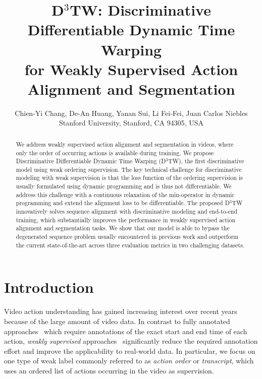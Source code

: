 \documentclass[10pt,twocolumn,letterpaper]{article}
\newcommand{\dttw}{D${}^3$TW\xspace}
\begin{document}
\title{D${}^3$TW: Discriminative Differentiable Dynamic Time Warping \\ for Weakly Supervised Action Alignment and Segmentation}
\vspace{-2mm}
\author{Chien-Yi Chang, De-An Huang, Yanan Sui, Li Fei-Fei, Juan Carlos Niebles\\
Stanford University, Stanford, CA 94305, USA\\
}

\maketitle
\thispagestyle{empty}

\begin{abstract} 
We address weakly supervised action alignment and segmentation in videos, where only the order of occurring actions is available during training.
We propose Discriminative Differentiable Dynamic Time Warping (D${}^3$TW), the first discriminative model using weak ordering supervision. The key technical challenge for discriminative modeling with weak supervision is that the loss function of the ordering supervision is usually formulated using dynamic programming and is thus not differentiable. We address this challenge with a continuous relaxation of the min-operator in dynamic programming and extend the alignment loss to be differentiable. The proposed \dttw innovatively solves sequence alignment with discriminative modeling and end-to-end training, which substantially improves the performance in weakly supervised action alignment and segmentation tasks. We show that our model is able to bypass the degenerated sequence problem usually encountered in previous work and outperform the current state-of-the-art across three evaluation metrics in two challenging datasets.
\end{abstract} \section{Introduction}
\label{sec:introduction}

Video action understanding has gained increasing interest over recent years because of the large amount of video data.
In contrast to fully annotated approaches~\cite{kuehne2014language,rohrbach2012database,yeung2015every} which require annotations of the exact start and end time of each action, \emph{weakly supervised} approaches~\cite{ding2018weakly,huang2016connectionist,richard2018neuralnetwork,bojanowski2014weakly,kuehne2017weakly} significantly reduce the required annotation effort and improve the applicability to real-world data. In particular, we focus on one type of weak label commonly referred to as \emph{action order} or \emph{transcript}, which uses an ordered list of actions occurring in the video as supervision. 
\end{document}
